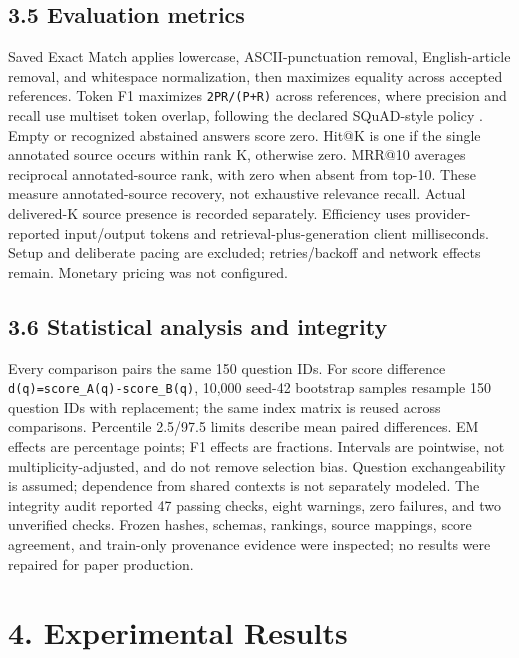 \documentclass[
  11pt,
]{article}
\begin{document}
\hypertarget{evaluation-metrics}{%
\subsection{3.5 Evaluation metrics}\label{evaluation-metrics}}

Saved Exact Match applies lowercase, ASCII-punctuation removal,
English-article removal, and whitespace normalization, then maximizes
equality across accepted references. Token F1 maximizes
\texttt{2PR/(P+R)} across references, where precision and recall use
multiset token overlap, following the declared SQuAD-style policy
\citep{squad}. Empty or recognized abstained answers score zero. Hit@K
is one if the single annotated source occurs within rank K, otherwise
zero. MRR@10 averages reciprocal annotated-source rank, with zero when
absent from top-10. These measure annotated-source recovery, not
exhaustive relevance recall. Actual delivered-K source presence is
recorded separately. Efficiency uses provider-reported input/output
tokens and retrieval-plus-generation client milliseconds. Setup and
deliberate pacing are excluded; retries/backoff and network effects
remain. Monetary pricing was not configured.

\hypertarget{statistical-analysis-and-integrity}{%
\subsection{3.6 Statistical analysis and
integrity}\label{statistical-analysis-and-integrity}}

Every comparison pairs the same 150 question IDs. For score difference
\texttt{d(q)=score\_A(q)-score\_B(q)}, 10,000 seed-42 bootstrap samples
resample 150 question IDs with replacement; the same index matrix is
reused across comparisons. Percentile 2.5/97.5 limits describe mean
paired differences. EM effects are percentage points; F1 effects are
fractions. Intervals are pointwise, not multiplicity-adjusted, and do
not remove selection bias. Question exchangeability is assumed;
dependence from shared contexts is not separately modeled. The integrity
audit reported 47 passing checks, eight warnings, zero failures, and two
unverified checks. Frozen hashes, schemas, rankings, source mappings,
score agreement, and train-only provenance evidence were inspected; no
results were repaired for paper production.

\hypertarget{experimental-results}{%
\section{4. Experimental Results}\label{experimental-results}}
\end{document}
